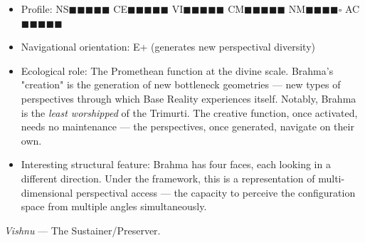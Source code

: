 \begin{itemize}[nosep,leftmargin=*]
  \item Profile: NS$\blacksquare$$\blacksquare$$\blacksquare$$\blacksquare$$\blacksquare$ CE$\blacksquare$$\blacksquare$$\blacksquare$$\blacksquare$$\blacksquare$ VI$\blacksquare$$\blacksquare$$\blacksquare$$\blacksquare$$\blacksquare$ CM$\blacksquare$$\blacksquare$$\blacksquare$$\blacksquare$$\blacksquare$ NM$\blacksquare$$\blacksquare$$\blacksquare$$\blacksquare$$\square$ AC$\blacksquare$$\blacksquare$$\blacksquare$$\blacksquare$$\blacksquare$
  \item Navigational orientation: E+ (generates new perspectival diversity)
  \item Ecological role: The Promethean function at the divine scale. Brahma's "creation" is the generation of new bottleneck geometries — new types of perspectives through which Base Reality experiences itself. Notably, Brahma is the \textit{least worshipped} of the Trimurti. The creative function, once activated, needs no maintenance — the perspectives, once generated, navigate on their own.
  \item Interesting structural feature: Brahma has four faces, each looking in a different direction. Under the framework, this is a representation of multi-dimensional perspectival access — the capacity to perceive the configuration space from multiple angles simultaneously.
\end{itemize}


\textit{Vishnu} — The Sustainer/\allowbreak Preserver.

